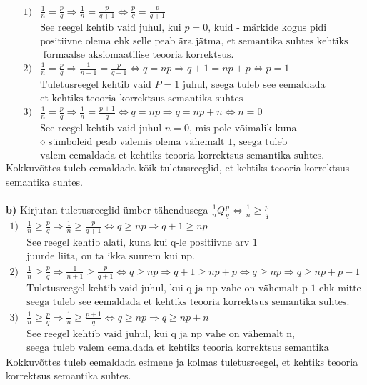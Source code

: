 \documentclass{article}
\begin{document}
\begin{equation*}
\begin{aligned}
1)& \frac{1}{n}=\frac{p}{q}\Rightarrow\frac{1}{n}=\frac{p}{q+1}\Leftrightarrow\frac{p}{q}=\frac{p}{q+1}\\
&\text{See reegel kehtib vaid juhul, kui }p=0\text{, kuid - m\"arkide kogus pidi}\\
&\text{positiivne olema ehk selle peab \"ara j\"atma, et semantika suhtes kehtiks}\\
&\text{ formaalse aksiomaatilise teooria korrektsus.}\\
2)& \frac{1}{n}=\frac{p}{q}\Rightarrow\frac{1}{n+1}=\frac{p}{q+1}\Leftrightarrow q=np\Rightarrow q+1=np+p\Leftrightarrow p=1\\
&\text{Tuletusreegel kehtib vaid }P=1\text{ juhul, seega tuleb see eemaldada}\\
&\text{et kehtiks teooria korrektsus semantika suhtes}\\
3)& \frac{1}{n}=\frac{p}{q}\Rightarrow\frac{1}{n}=\frac{p+1}{q}\Leftrightarrow q=np\Rightarrow q=np+n\Leftrightarrow n=0\\
&\text{See reegel kehtib vaid juhul }n=0\text{, mis pole v\~oimalik kuna }\\
&\diamond\text{ s\"umboleid peab valemis olema v\"ahemalt 1, seega tuleb}\\
&\text{valem eemaldada et kehtiks teooria korrektsus semantika suhtes.}
\end{aligned}
\end{equation*}
Kokkuv\~ottes tuleb eemaldada k\~oik tuletusreeglid, et kehtiks teooria korrektsus semantika suhtes.\\\pagebreak\\
\textbf{b)} Kirjutan tuletusreeglid \"umber t\"ahendusega $\frac{1}{n}Q\frac{p}{q}\Leftrightarrow\frac{1}{n}\geq\frac{p}{q}$ \\
\begin{equation*}
\begin{aligned}
1)& \frac{1}{n}\geq\frac{p}{q}\Rightarrow\frac{1}{n}\geq\frac{p}{q+1}\Leftrightarrow q\geq np\Rightarrow q+1\geq np\\
&\text{See reegel kehtib alati, kuna kui q-le positiivne arv 1 }\\
&\text{juurde liita, on ta ikka suurem kui np.}\\
2)& \frac{1}{n}\geq\frac{p}{q}\Rightarrow\frac{1}{n+1}\geq\frac{p}{q+1}\Leftrightarrow q\geq np\Rightarrow q+1\geq np+p\Leftrightarrow q\geq np\Rightarrow q\geq np+p-1\\
&\text{Tuletusreegel kehtib vaid juhul, kui q ja np vahe on v\"ahemalt p-1 ehk mitte alati}\\
&\text{seega tuleb see eemaldada et kehtiks teooria korrektsus semantika suhtes.}\\
3)& \frac{1}{n}\geq\frac{p}{q}\Rightarrow\frac{1}{n}\geq\frac{p+1}{q}\Leftrightarrow q\geq np\Rightarrow q\geq np+n\\
&\text{See reegel kehtib vaid juhul, kui q ja np vahe on vähemalt n,}\\
&\text{seega tuleb valem eemaldada et kehtiks teooria korrektsus semantika suhtes.}
\end{aligned}
\end{equation*}
Kokkuv\~ottes tuleb eemaldada esimene ja kolmas tuletusreegel, et kehtiks teooria korrektsus semantika suhtes.
\end{document}

